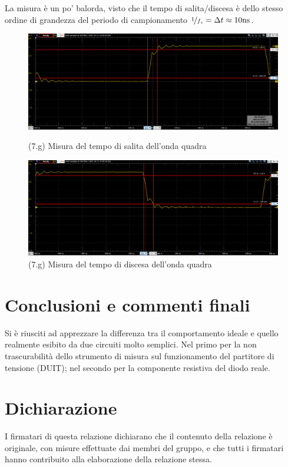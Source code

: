 \documentclass[10pt,a4paper]{article}
\begin{document}
La misura è un po' balorda, visto che il tempo di salita/discesa è dello
stesso ordine di grandezza del periodo di campionamento $\nicefrac{1}{f_s} = \Delta t \approx 10 \si{\ns}$.
\begin{figure}[htb]
\centering
\includegraphics[scale=0.4]{tempo_salita}
\caption{(7.g) Misura del tempo di salita dell'onda quadra }

\includegraphics[scale=0.4]{tempo_discesa}
\caption{(7.g) Misura del tempo di discesa dell'onda quadra }
\end{figure}


\section{Conclusioni e commenti finali}
Si è riusciti ad apprezzare la differenza tra il comportamento ideale e quello
realmente esibito da due circuiti molto semplici. Nel primo per la non
trascurabilità dello strumento di misura sul funzionamento del partitore di
tensione (DUIT); nel secondo per la componente resistiva del diodo reale.

\section*{Dichiarazione}
I firmatari di questa relazione dichiarano che il contenuto della relazione
\`e originale, con misure effettuate dai membri del gruppo, e che tutti i
firmatari hanno contribuito alla elaborazione della relazione stessa.
\end{document}
